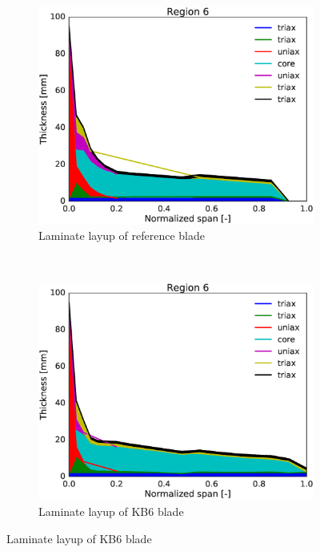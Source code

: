 \begin{figure}[tph]
\begin{subfigure}{0.50\textwidth}
\includegraphics[width=\linewidth]{figures/KB6_final/baseline_laminate_layers_r06.eps}
\caption{Laminate layup of reference blade}
\label{subfig:baseline_layers_r06}
\end{subfigure}
 ~
\begin{subfigure}{0.50\textwidth}
\includegraphics[width=\linewidth]{figures/KB6_final/KB6_laminate_layers_r06.eps}
\caption{Laminate layup of KB6 blade}
\label{subfig:KB6_layers_r06}
\end{subfigure}


\end{figure}
